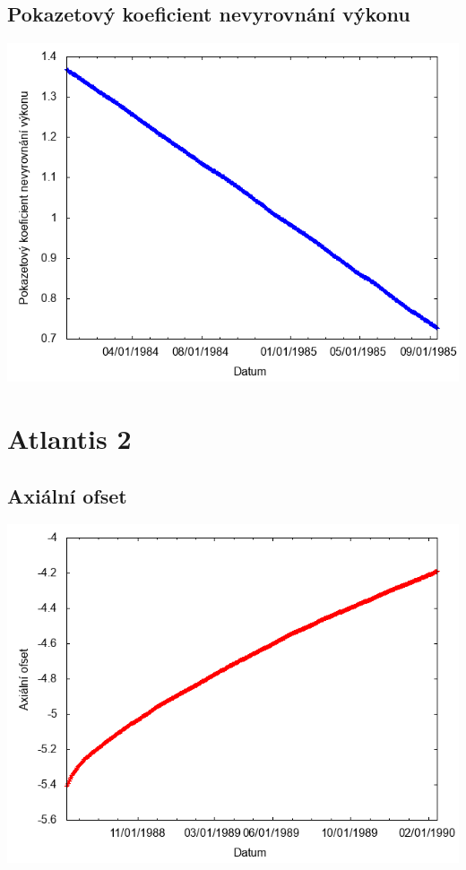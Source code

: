 \documentclass[a4paper,twoside,11pt]{article}
\begin{document}
\subsection*{Pokazetový koeficient nevyrovnání výkonu}
\begin{center}
\includegraphics[width=.8\textwidth]{graphs/Atlantis_01_fha.png}
\end{center}

\newpage
\section*{Atlantis 2}
\subsection*{Axiální ofset}
\begin{center}
\includegraphics[width=.8\textwidth]{graphs/Atlantis_02_ao.png}
\end{center}
\end{document}
